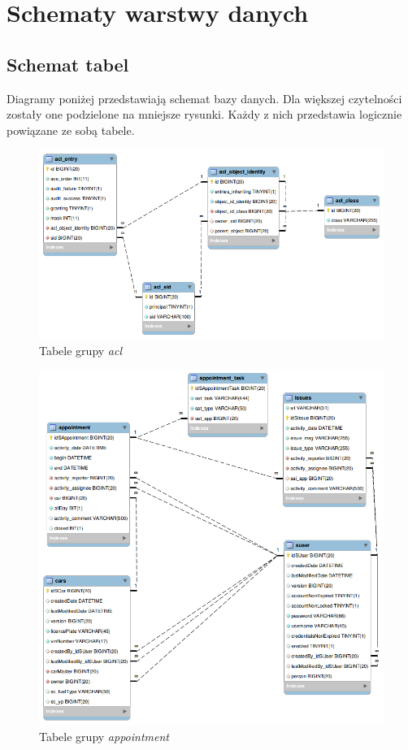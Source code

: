 \section{Schematy warstwy danych}

	\subsection{Schemat tabel}
	Diagramy poniżej przedstawiają schemat bazy danych. Dla większej czytelności zostały one podzielone na mniejsze rysunki.
	Każdy z nich przedstawia logicznie powiązane ze sobą tabele. 
	\begin{figure}[th]
		\centering
		\includegraphics[width=1.0\textwidth]{images/db/acl}
		\caption[Tabele grupy \textit{acl}]{
			Tabele grupy \textit{acl}
		}
		\label{app:schema_db}
	\end{figure}
	\clearpage
	\begin{figure}[H]
		\centering
		\includegraphics[width=1.0\textwidth]{images/db/appointment}
		\caption[Tabele grupy \textit{appointment}]{
			Tabele grupy \textit{appointment}
		}
		\label{app:schema_db}
	\end{figure}

